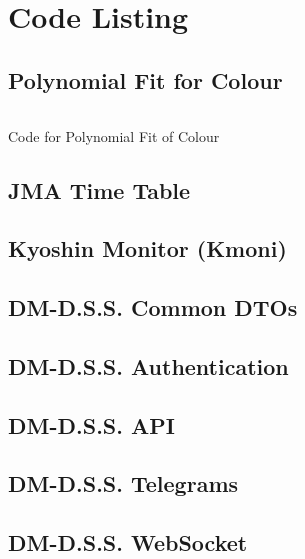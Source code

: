 \chapter{Code Listing}
\section{Polynomial Fit for Colour}
\begin{normallisting}
    \inputminted{python3}{\CodeBasePath python/poly-fit.py}
    \caption{Code for Polynomial Fit of Colour}
    \label{code-listing:poly-fit}
\end{normallisting}

\newcommand{\GeneratedTexBase}{outputTex/}

\section{JMA Time Table}


\section{Kyoshin Monitor (Kmoni)}


\section{DM-D.S.S. Common DTOs}


\section{DM-D.S.S. Authentication}


\section{DM-D.S.S. API}


\section{DM-D.S.S. Telegrams}


\section{DM-D.S.S. WebSocket}



